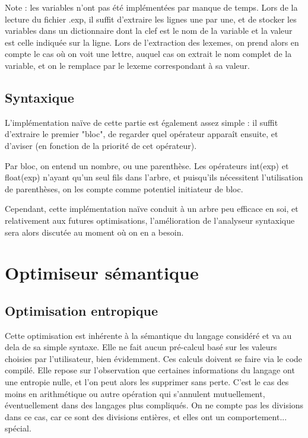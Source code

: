 \documentclass{article}
\begin{document}
Note : les variables n'ont pas été implémentées par manque de temps. Lors de la lecture du fichier .exp, il suffit d'extraire les lignes une par une, et de stocker les variables dans un dictionnaire dont la clef est le nom de la variable et la valeur est celle indiquée sur la ligne. Lors de l'extraction des lexemes, on prend alors en compte le cas où on voit une lettre, auquel cas on extrait le nom complet de la variable, et on le remplace par le lexeme correspondant à sa valeur.

\subsection{Syntaxique}

L'implémentation naïve de cette partie est également assez simple : il suffit d'extraire le premier "bloc", de regarder quel opérateur apparaît ensuite, et d'aviser (en fonction de la priorité de cet opérateur).

Par bloc, on entend un nombre, ou une parenthèse. Les opérateurs int(exp) et float(exp) n'ayant qu'un seul fils dans l'arbre, et puisqu'ils nécessitent l'utilisation de parenthèses, on les compte comme potentiel initiateur de bloc.

Cependant, cette implémentation naïve conduit à un arbre peu efficace en soi, et relativement aux futures optimisations, l'amélioration de l'analyseur syntaxique sera alors discutée au moment où on en a besoin.

\section{Optimiseur sémantique}

\subsection{Optimisation entropique}
Cette optimisation est inhérente à la sémantique du langage considéré et va au dela de sa simple syntaxe. Elle ne fait aucun pré-calcul basé sur les valeurs choisies par l'utilisateur, bien évidemment. Ces calculs doivent se faire via le code compilé.
Elle repose sur l'observation que certaines informations du langage ont une entropie nulle, et l'on peut alors les supprimer sans perte. C'est le cas des moins en arithmétique ou autre opération qui s'annulent mutuellement, éventuellement dans des langages plus compliqués. On ne compte pas les divisions dans ce cas, car ce sont des divisions entières, et elles ont un comportement... spécial.
\end{document}
